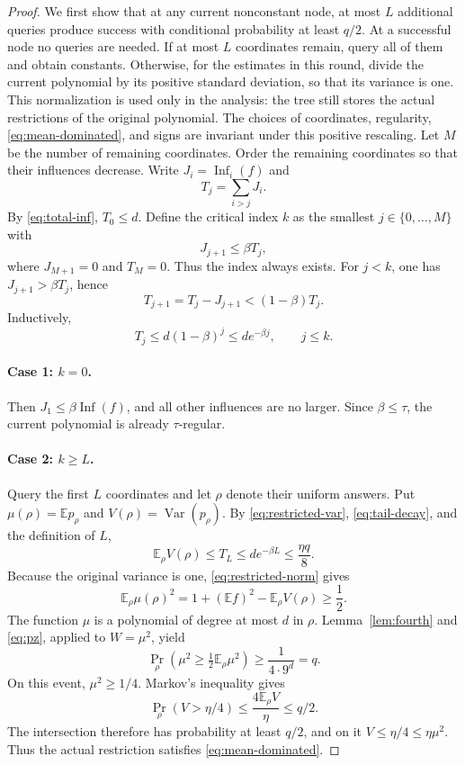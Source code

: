 \documentclass[11pt]{article}
\newcommand{\E}{\mathbb E}
\newcommand{\Var}{\operatorname{Var}}
\newcommand{\Inf}{\operatorname{Inf}}
\newcommand{\1}{\mathbf 1}
\theoremstyle{definition}
\theoremstyle{remark}
\numberwithin{equation}{section}
\begin{document}
\begin{proof}
We first show that at any current nonconstant node, at most $L$ additional queries produce success with conditional probability at least $q/2$. At a successful node no queries are needed. If at most $L$ coordinates remain, query all of them and obtain constants. Otherwise, for the estimates in this round, divide the current polynomial by its positive standard deviation, so that its variance is one. This normalization is used only in the analysis: the tree still stores the actual restrictions of the original polynomial. The choices of coordinates, regularity, \eqref{eq:mean-dominated}, and signs are invariant under this positive rescaling. Let $M$ be the number of remaining coordinates. Order the remaining coordinates so that their influences decrease. Write $J_i=\Inf_i(f)$ and
\[
 T_j=\sum_{i>j}J_i.
\]
By \eqref{eq:total-inf}, $T_0\le d$. Define the critical index $k$ as the smallest $j\in\{0,\ldots,M\}$ with
\[
 J_{j+1}\le\beta T_j,
\]
where $J_{M+1}=0$ and $T_{M}=0$. Thus the index always exists. For $j<k$, one has $J_{j+1}>\beta T_j$, hence
\[
 T_{j+1}=T_j-J_{j+1}<(1-\beta)T_j.
\]
Inductively,
\begin{equation}\label{eq:tail-decay}
 T_j\le d(1-\beta)^j\le de^{-\beta j},\qquad j\le k.
\end{equation}

\paragraph{Case 1: $k=0$.}
Then $J_1\le\beta\Inf(f)$, and all other influences are no larger. Since $\beta\le\tau$, the current polynomial is already $\tau$-regular.

\paragraph{Case 2: $k\ge L$.}
Query the first $L$ coordinates and let $\rho$ denote their uniform answers. Put $\mu(\rho)=\E p_\rho$ and $V(\rho)=\Var(p_\rho)$. By \eqref{eq:restricted-var}, \eqref{eq:tail-decay}, and the definition of $L$,
\[
 \E_\rho V(\rho)\le T_L\le de^{-\beta L}\le\frac{\eta q}{8}.
\]
Because the original variance is one, \eqref{eq:restricted-norm} gives
\[
 \E_\rho\mu(\rho)^2
 =1+(\E f)^2-\E_\rho V(\rho)\ge\frac12.
\]
The function $\mu$ is a polynomial of degree at most $d$ in $\rho$. Lemma~\ref{lem:fourth} and \eqref{eq:pz}, applied to $W=\mu^2$, yield
\[
 \Pr_\rho\left(\mu^2\ge\tfrac12\E_\rho\mu^2\right)
 \ge\frac1{4\cdot9^d}=q.
\]
On this event, $\mu^2\ge1/4$. Markov's inequality gives
\[
 \Pr_\rho(V>\eta/4)\le\frac{4\E_\rho V}{\eta}\le q/2.
\]
The intersection therefore has probability at least $q/2$, and on it $V\le\eta/4\le\eta\mu^2$. Thus the actual restriction satisfies \eqref{eq:mean-dominated}.


\end{proof}
\end{document}
